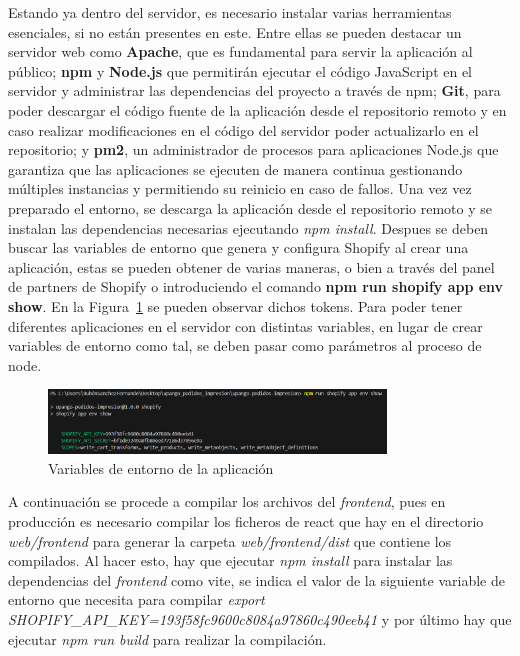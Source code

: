 \documentclass[12pt]{article}
\begin{document}
Estando ya dentro del servidor, es necesario instalar varias herramientas esenciales, si no están presentes en este. Entre ellas se pueden destacar un servidor web como \textbf{Apache}, que es fundamental para servir la aplicación
al público; \textbf{npm} y \textbf{Node.js} que permitirán ejecutar el código JavaScript en el servidor y administrar las dependencias del proyecto a través de npm; \textbf{Git}, para poder descargar el código fuente de la aplicación desde 
el repositorio remoto y en caso realizar modificaciones en el código del servidor poder actualizarlo en el repositorio; y \textbf{pm2}, un administrador de 
procesos para aplicaciones Node.js que garantiza que las aplicaciones se ejecuten de manera continua gestionando múltiples instancias y permitiendo su reinicio en caso de fallos.
Una vez vez preparado el entorno, se descarga la aplicación desde el repositorio remoto y se instalan las dependencias necesarias ejecutando \textit{npm install}. Despues se deben buscar las variables de entorno que genera y configura Shopify al crear una aplicación,
estas se pueden obtener de varias maneras, o bien a través del panel de partners de Shopify o introduciendo el comando \textbf{npm run shopify app env show}. En la Figura~\ref{fig:VariablesEntorno} se pueden observar dichos tokens. Para poder 
tener diferentes aplicaciones en el servidor con distintas variables, en lugar de crear variables de entorno como tal, se deben pasar como parámetros al proceso de node.

\begin{figure}[ht]
    \centering
    \includegraphics[width=0.8\textwidth]{imagenes/variablesEntornoDespliegue.png}
    \caption{\label{fig:VariablesEntorno}Variables de entorno de la aplicación}
    \vspace{\fill}
\end{figure}

A continuación se procede a compilar los archivos del \textit{frontend}, pues en producción es necesario compilar los ficheros de react que hay en el directorio \textit{web/frontend} 
para generar la carpeta \textit{web/frontend/dist} que contiene los compilados. Al hacer esto, hay que ejecutar \textit{npm install} para instalar las dependencias del \textit{frontend} como vite,
se indica el valor de la siguiente variable de entorno que necesita para compilar \textit{export SHOPIFY\_API\_KEY=193f58fc9600c8084a97860c490eeb41} y por último hay que ejecutar \textit{npm run build} para realizar
la compilación.
\end{document}

